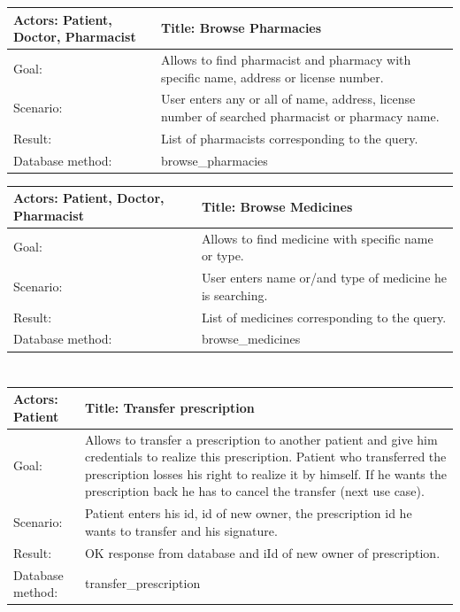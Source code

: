 \begin{longtable}{|p{6cm}|p{7.75cm}|}
    
    \hline
    Actors: Patient, Doctor, Pharmacist &Title: Browse Pharmacies \\ \hline
    Goal: & Allows to find pharmacist and pharmacy with specific name, address or license number. \\ \hline
    Scenario: & User enters any or all of name, address, license number of searched pharmacist or pharmacy name. \\ \hline
    Result: & List of pharmacists corresponding to the query. \\ \hline
    Database  method: & browse\_pharmacies \\ \hline

\end{longtable}


    \begin{longtable}{| p{6cm} | p{7.75cm} |}
    \hline
    Actors: Patient, Doctor, Pharmacist &Title: Browse Medicines \\ \hline
    Goal: & Allows to find medicine with specific name or type. \\ \hline
    Scenario: & User enters name or/and type of medicine he is searching. \\ \hline
    Result: & List of medicines corresponding to the query. \\ \hline
    Database  method: & browse\_medicines \\ \hline
    \end{longtable}

\normalsize

\section{}

\small
    \begin{longtable}{| p{6cm} | p{7.75cm} |}
    \hline
    Actors: Patient &Title: Transfer prescription \\ \hline
    Goal: & Allows to transfer a prescription to another patient and give him credentials to realize this prescription. Patient who transferred the prescription losses his right to realize it by himself. If he wants the prescription back he has to cancel the transfer (next use case). \\ \hline
    Scenario: & Patient enters his id, id of new owner, the prescription id he wants to transfer and his signature. \\ \hline
    Result: & OK response from database and iId of new owner of prescription. \\ \hline
    Database  method: & transfer\_prescription \\ \hline
\end{longtable}

